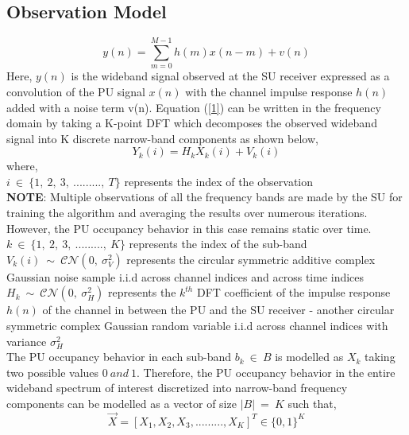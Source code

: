 \documentclass[12pt, draftcls, onecolumn]{IEEEtran}
\begin{document}
\subsection{Observation Model}
\begin{equation}\label{1}
    y(n) = \sum_{m=0}^{M-1} h(m)x(n-m) + v(n)
\end{equation}
Here, $y(n)$ is the wideband signal observed at the SU receiver expressed as a convolution of the PU signal $x(n)$ with the channel impulse response $h(n)$ added with a noise term v(n).
Equation (\ref{1}) can be written in the frequency domain by taking a K-point DFT which decomposes the observed wideband signal into K discrete narrow-band components as shown below,
\begin{equation}\label{2}
    Y_k(i) = H_kX_k(i) + V_k(i)
\end{equation}
where,
\\$i\ \in\ \{1,\ 2,\ 3,\ .........,\ T\}$ represents the index of the observation
\\\textbf{NOTE}: Multiple observations of all the frequency bands are made by the SU for training the algorithm and averaging the results over numerous iterations. However, the PU occupancy behavior in this case remains static over time.
\\$k\ \in\ \{1,\ 2,\ 3,\ .........,\ K\}$ represents the index of the sub-band
\\$V_k(i)\ \sim\ \mathcal{CN}(0,\ \sigma_V^2)$ represents the circular symmetric additive complex Gaussian noise sample i.i.d across channel indices and across time indices
\\$H_k\ \sim\ \mathcal{CN}(0,\ \sigma_H^2)$ represents the $k^{th}$ DFT coefficient of the impulse response $h(n)$ of the channel in between the PU and the SU receiver - another circular symmetric complex Gaussian random variable i.i.d across channel indices with variance $\sigma_H^2$
\\The PU occupancy behavior in each sub-band $b_k\ \in\ B$ is modelled as $X_k$ taking two possible values $0\ and\ 1$. Therefore, the PU occupancy behavior in the entire wideband spectrum of interest discretized into narrow-band frequency components can be modelled as a vector of size $|B|\ =\ K$ such that,
\begin{equation}\label{3}
    \vec{X} = [X_1, X_2, X_3, ........., X_K]^T \in \{0,1\}^K
\end{equation}
\end{document}
